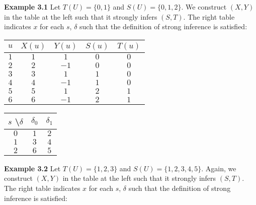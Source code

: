 \documentclass[11pt]{article}
\begin{document}
 
 \textbf{Example 3.1} \quad Let $ T(U) = \{0 , 1\} $ and $ S(U) = \{0, 1, 2\} $. We construct $ (X, Y) $ in the table at the left such that it strongly infers $ (S, T) $. The right table indicates $ x $ for each $ s $, $ \delta $ such that the definition of strong inference is satisfied: \\ 
 \begin {center}
 \begin{tabular}{ |c||c|c|c|c| } 

 \hline
 $ u $ & $ X(u) $ & $ Y(u) $ & $ S(u) $ & $ T(u) $ \\ 
 \hline
 \hline
 $ 1 $ & $ 1 $ & $ 1 $ & $ 0 $ & $ 0 $ \\
 \hline
 $ 2 $ & $ 2 $ & $ -1 $ & $ 0 $ & $ 0 $ \\
 \hline
 $ 3 $ & $ 3 $ & $ 1 $ & $ 1 $ & $ 0 $ \\
 \hline
 $ 4 $ & $ 4 $ & $ -1 $ & $ 1 $ & $ 0 $ \\
 \hline 
 $ 5 $ & $ 5 $ & $ 1 $ & $ 2 $ & $ 1 $ \\
 \hline 
 $ 6 $ & $ 6 $ & $ -1 $ & $ 2 $ & $ 1 $ \\
 \hline
 \end{tabular} 
 \quad 
 \begin{tabular}{ |c||c|c| } 

 \hline
 $ s $ \textbackslash $ \delta $ & $ \delta_0 $ & $ \delta_1 $ \\ 
 \hline
 \hline
 $ 0 $ & $ 1 $ & $ 2 $  \\
 \hline
 $ 1 $ & $ 3 $ & $ 4 $ \\
 \hline
 $ 2 $ & $ 6 $ & $ 5 $ \\
 \hline
 
 \end{tabular}
 \end{center}
 
  
 \bigskip
 \bigskip 
 \textbf{Example 3.2} \quad Let $ T(U) = \{1, 2, 3\} $ and $ S(U) = \{1, 2, 3, 4, 5\} $. Again, we construct $ (X, Y) $ in the table at the left such that it strongly infers $ (S, T) $. The right table indicates $ x $ for each $ s $, $ \delta $ such that the definition of strong inference is satisfied: \\ 
\end{document}
